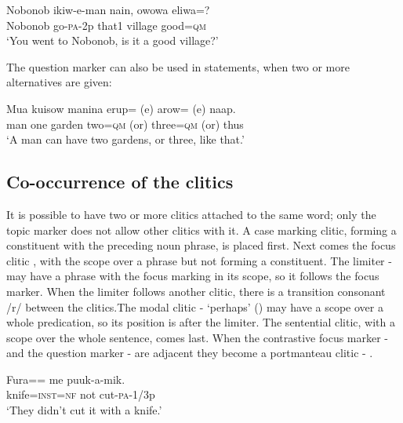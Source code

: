 \ea%
\label{ex:3:x790}
\gll Nobonob ikiw-e-man nain, owowa eliwa=? \\
Nobonob go-\textsc{pa}-2p that1 village good=\textsc{qm}\\
\glt`You went to Nobonob, is it a good village?'
\z

The question marker can also be used in statements, when two or more alternatives are given:

\ea%
\label{ex:3:x791}
\gll Mua kuisow manina erup= (e) arow= (e) naap. \\
man one garden two=\textsc{qm} (or) three=\textsc{qm} (or) thus\\
\glt`A man can have two gardens, or three, like that.'
\z

\subsection{Co-occurrence of the clitics}\label{sec:3:y:x}
{}
It is possible to have two or more clitics attached to the same word; only the topic marker does not allow other clitics with it. A case marking clitic, forming a constituent with the preceding noun phrase, is placed first. Next comes the focus clitic , with the scope over a phrase but not forming a constituent. The limiter \nobreakdash- may have a phrase with the focus marking in its scope, so it follows the focus marker. When the limiter follows another clitic, there is a transition consonant /r/ between the clitics.The modal clitic \nobreakdash- `perhaps' () may have a scope over a whole predication, so its position is after the limiter. The sentential clitic, with a scope over the whole sentence, comes last. When the contrastive focus marker - and the question marker - are adjacent they become a portmanteau clitic - .

\ea%
\label{ex:3:x792}
\gll Fura== me puuk-a-mik. \\
knife=\textsc{inst}=\textsc{nf} not cut-\textsc{pa}-1/3p\\
\glt`They didn't cut it with a knife.'
\z

